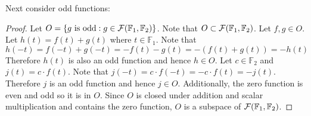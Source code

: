 \documentclass[12pt,titlepage]{extarticle}
\begin{document}
Next consider odd functions:
\begin{proof}
	Let $O = \qty{g\text{ is odd} : g\in\mathcal{F}(\mathbb{F}_1, \mathbb{F}_2)}$. Note that $O \subset \mathcal{F}(\mathbb{F}_1, \mathbb{F}_2)$. Let $f,g \in O$. Let $h(t) = f(t) + g(t)$ where $t \in \mathbb{F}_1$. Note that
	\[
		h(-t) = f(-t) + g(-t) = -f(t) - g(t) = -(f(t) + g(t)) = -h(t)
	\]
	Therefore $h(t)$ is also an odd function and hence $h \in O$. Let $c \in \mathbb{F}_2$ and $j(t) = c \cdot f(t)$. Note that $j(-t) = c \cdot f(-t) = -c \cdot f(t) = -j(t)$. Therefore $j$ is an odd function and hence $j \in O$. Additionally, the zero function is even and odd so it is in $O$. Since $O$ is closed under addition and scalar multiplication and contains the zero function, $O$ is a subspace of $\mathcal{F}(\mathbb{F}_1, \mathbb{F}_2)$.
\end{proof}
\end{document}
